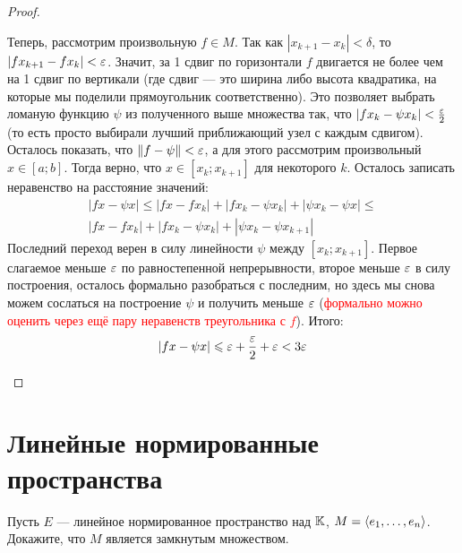 \begin{proof}
\begin{itemize}
		Теперь, рассмотрим произвольную $f \in M$. Так как $|x_{k + 1} - x_k| < \delta$, то $|fx_{k + 1} - fx_k| < \varepsilon$. Значит, за 1 сдвиг по горизонтали $f$ двигается не более чем на 1 сдвиг по вертикали (где сдвиг --- это ширина либо высота квадратика, на которые мы поделили прямоугольник соответственно). Это позволяет выбрать ломаную функцию $\psi$ из полученного выше множества так, что $|fx_k - \psi x_k| < \frac{\varepsilon}{2}$ (то есть просто выбирали лучший приближающий узел с каждым сдвигом). Осталось показать, что $\|f - \psi\| < \varepsilon$, а для этого рассмотрим произвольный $x \in [a; b]$. Тогда верно, что $x \in [x_k; x_{k + 1}]$ для некоторого $k$. Осталось записать неравенство на расстояние значений:
		\begin{multline*}
			|fx - \psi x| \le |fx - fx_k| + |fx_k - \psi x_k| + |\psi x_k - \psi x| \le
			\\
			|fx - fx_k| + |fx_k - \psi x_k| + |\psi x_k - \psi x_{k + 1}|
		\end{multline*}
		Последний переход верен в силу линейности $\psi$ между $[x_k; x_{k + 1}]$. Первое слагаемое меньше $\varepsilon$ по равностепенной непрерывности, второе меньше $\varepsilon$ в силу построения, осталось формально разобраться с последним, но здесь мы снова можем сослаться на построение $\psi$ и получить меньше $\varepsilon$ (\textcolor{red}{формально можно оценить через ещё пару неравенств треугольника с $f$}). Итого:
		\[
			|fx - \psi x| \leqslant \varepsilon + \frac{\varepsilon}{2} + \varepsilon < 3\varepsilon
		\]
	\end{itemize}
\end{proof}

\section{Линейные нормированные пространства}

\begin{exercise}
	Пусть $E$ --- линейное нормированное пространство над $\mathbb{K}$, $M = \left\langle e_1, \ldots, e_n\right\rangle$. Докажите, что $M$ является замкнутым множеством.
\end{exercise}